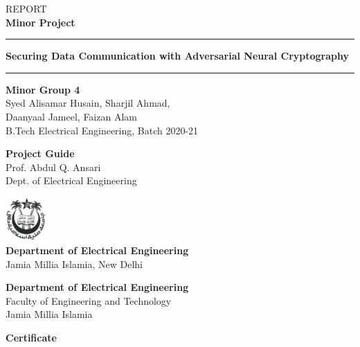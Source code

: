 \documentclass[a4paper]{article}
\begin{document}
  \begin{titlepage}
    \vspace*{\fill}
    \begin{center}
      {\large REPORT}\\[0.1in]
      {\bfseries{\Huge Minor Project}}
      \vspace{0.5in}
      \par\noindent\rule{\textwidth}{0.5pt}

      \vspace{0.25in}
      {\bfseries {\LARGE Securing Data Communication with Adversarial Neural Cryptography}}\\
      \vspace{0.2in}
      \par\noindent\rule{\textwidth}{0.5pt}
      \vspace{2in}

      {\bfseries Minor Group 4}\\
      {\large Syed Alisamar Husain, Sharjil Ahmad,\\ Daanyaal Jameel, Faizan Alam\\}
      B.Tech Electrical Engineering, Batch 2020-21\\
      \vspace{0.5in}

      {\bfseries Project Guide}\\
      {\large Prof. Abdul Q. Ansari\\}
      Dept. of Electrical Engineering
      \vspace{1in}

      \includegraphics[height=0.65in]{../ref/JMI.png}\\
      {\bfseries Department of Electrical Engineering} \\
      Jamia Millia Islamia, New Delhi
      \thispagestyle{empty}
    \end{center}
    \vspace*{\fill}
  \end{titlepage}

  \newpage
  \begin{center}
    {\Large \bfseries Department of Electrical Engineering}\\
    {\large Faculty of Engineering and Technology}\\
    {\large Jamia Millia Islamia}
  \end{center}
  \vspace*{1in}
  \begin{center}
    {\LARGE \bfseries Certificate}
    \vspace*{0.125in}
  \end{center}
\end{document}
